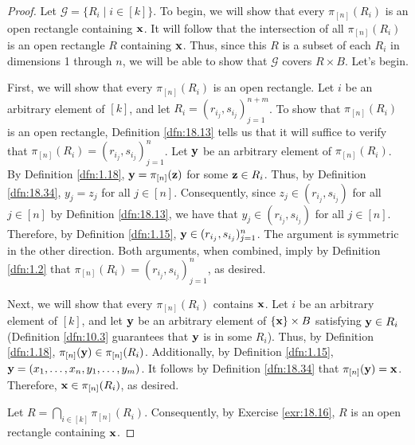\documentclass[../main.tex]{subfiles}
\begin{document}
\begin{lemma}
\begin{proof}
        Let $\mathcal{G}=\{R_i\mid i\in[k]\}$. To begin, we will show that every $\pi_{[n]}(R_i)$ is an open rectangle containing $\mathbf{x}$. It will follow that the intersection of all $\pi_{[n]}(R_i)$ is an open rectangle $R$ containing $\mathbf{x}$. Thus, since this $R$ is a subset of each $R_i$ in dimensions 1 through $n$, we will be able to show that $\mathcal{G}$ covers $R\times B$. Let's begin.\par\smallskip
        First, we will show that every $\pi_{[n]}(R_i)$ is an open rectangle. Let $i$ be an arbitrary element of $[k]$, and let $R_i=(r_{i_j},s_{i_j})_{j=1}^{n+m}$. To show that $\pi_{[n]}(R_i)$ is an open rectangle, Definition \ref{dfn:18.13} tells us that it will suffice to verify that $\pi_{[n]}(R_i)=(r_{i_j},s_{i_j})_{j=1}^n$. Let $\mathbf{y}$ be an arbitrary element of $\pi_{[n]}(R_i)$. By Definition \ref{dfn:1.18}, $\mathbf{y}=\pi_{[n]}(\mathbf{z})$ for some $\mathbf{z}\in R_i$. Thus, by Definition \ref{dfn:18.34}, $y_j=z_j$ for all $j\in[n]$. Consequently, since $z_j\in(r_{i_j},s_{i_j})$ for all $j\in[n]$ by Definition \ref{dfn:18.13}, we have that $y_j\in(r_{i_j},s_{i_j})$ for all $j\in[n]$. Therefore, by Definition \ref{dfn:1.15}, $\mathbf{y}\in(r_{i_j},s_{i_j})_{j=1}^n$. The argument is symmetric in the other direction. Both arguments, when combined, imply by Definition \ref{dfn:1.2} that $\pi_{[n]}(R_i)=(r_{i_j},s_{i_j})_{j=1}^n$, as desired.\par
        Next, we will show that every $\pi_{[n]}(R_i)$ contains $\mathbf{x}$. Let $i$ be an arbitrary element of $[k]$, and let $\mathbf{y}$ be an arbitrary element of $\{\mathbf{x}\}\times B$ satisfying $\mathbf{y}\in R_i$ (Definition \ref{dfn:10.3} guarantees that $\mathbf{y}$ is in some $R_i$). Thus, by Definition \ref{dfn:1.18}, $\pi_{[n]}(\mathbf{y})\in\pi_{[n]}(R_i)$. Additionally, by Definition \ref{dfn:1.15}, $\mathbf{y}=(x_1,\dots,x_n,y_1,\dots,y_m)$. It follows by Definition \ref{dfn:18.34} that $\pi_{[n]}(\mathbf{y})=\mathbf{x}$. Therefore, $\mathbf{x}\in\pi_{[n]}(R_i)$, as desired.\par
        Let $R=\bigcap_{i\in[k]}\pi_{[n]}(R_i)$. Consequently, by Exercise \ref{exr:18.16}, $R$ is an open rectangle containing $\mathbf{x}$.\par

\end{proof}
\end{lemma}
\end{document}

